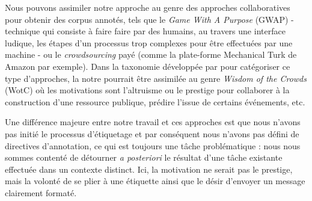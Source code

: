 Nous pouvons assimiler notre approche au genre des approches collaboratives pour obtenir des corpus annotés, tels que le \textit{Game With A Purpose} (GWAP) \cite{ahn:2006:computer} - technique qui consiste à faire faire par des humains, au travers une interface ludique, les étapes d'un processus trop complexes pour être effectuées par une machine - ou le \textit{crowdsourcing} payé \cite{fort:2011:cl} (comme la plate-forme Mechanical Turk de Amazon par exemple). Dans la taxonomie développée par \cite{wang:2013:lre} pour catégoriser ce type d'approches, la notre pourrait être assimilée au genre \textit{Wisdom of the Crowds} (WotC) où les motivations sont l'altruisme ou le prestige pour collaborer à la construction d'une ressource publique, prédire l'issue de certains événements, etc.

Une différence majeure entre notre travail et ces approches est que nous n'avons pas initié le processus d'étiquetage et par conséquent nous n'avons pas défini de directives d'annotation, ce qui est toujours une tâche problématique : nous nous sommes contenté de détourner \textit{a posteriori} le résultat d'une tâche existante effectuée dans un contexte distinct. Ici, la motivation ne serait pas le prestige, mais la volonté de se plier à une étiquette ainsi que le désir d'envoyer un message clairement formaté.